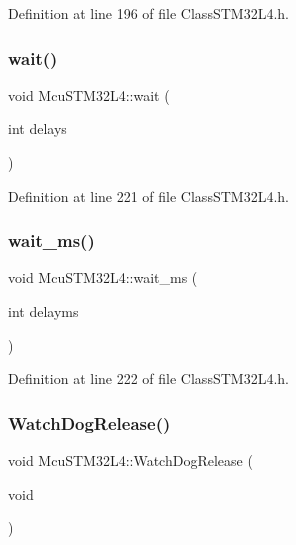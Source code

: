 Definition at line 196 of file Class\+S\+T\+M32\+L4.\+h.

\mbox{\label{class_mcu_s_t_m32_l4_ab861c14dba5d68a7eaebb31fdaac745b}} 
\subsubsection{\texorpdfstring{wait()}{wait()}}
{\footnotesize\ttfamily void Mcu\+S\+T\+M32\+L4\+::wait (\begin{DoxyParamCaption}\item[{int}]{delays }\end{DoxyParamCaption})\hspace{0.3cm}{\ttfamily [inline]}}



Definition at line 221 of file Class\+S\+T\+M32\+L4.\+h.

\mbox{\label{class_mcu_s_t_m32_l4_a3e9a267296f3b9281f3213fbfa9328e3}} 
\subsubsection{\texorpdfstring{wait\+\_\+ms()}{wait\_ms()}}
{\footnotesize\ttfamily void Mcu\+S\+T\+M32\+L4\+::wait\+\_\+ms (\begin{DoxyParamCaption}\item[{int}]{delayms }\end{DoxyParamCaption})\hspace{0.3cm}{\ttfamily [inline]}}



Definition at line 222 of file Class\+S\+T\+M32\+L4.\+h.

\mbox{\label{class_mcu_s_t_m32_l4_ae993ca7724a79b4cb09b4e0a316b62bb}} 
\subsubsection{\texorpdfstring{Watch\+Dog\+Release()}{WatchDogRelease()}}
{\footnotesize\ttfamily void Mcu\+S\+T\+M32\+L4\+::\+Watch\+Dog\+Release (\begin{DoxyParamCaption}\item[{void}]{ }\end{DoxyParamCaption})}

